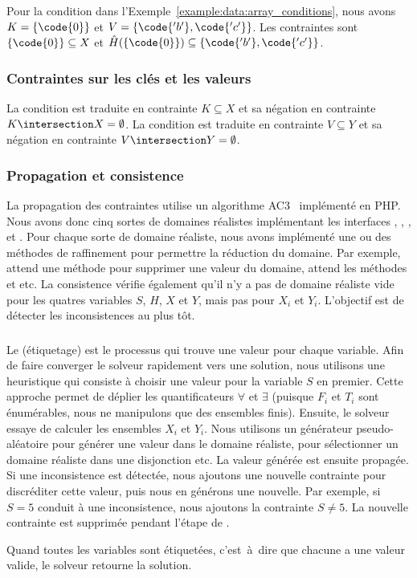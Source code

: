 Pour la condition  dans
l'Exemple~\ref{example:data:array_conditions}, nous avons $K = \{\code{0}\}$ et
$V = \{\code{'b'}, \code{'c'}\}$. Les contraintes sont $\{\code{0}\} \subseteq
X$ et $\hat{H}(\{\code{0}\}) \subseteq \{\code{'b'}, \code{'c'}\}$.

\subsubsection{Contraintes sur les clés et les valeurs}

La condition  est traduite en contrainte $K \subseteq X$ et sa
négation  en contrainte $K \intersection X = \emptyset$. La
condition  est traduite en contrainte $V \subseteq Y$ et sa
négation  en contrainte $V \intersection Y = \emptyset$.

\subsubsection{Propagation et consistence}

La propagation des contraintes utilise un algorithme AC3~
implémenté en PHP. Nous avons donc cinq sortes de domaines réalistes
implémentant les interfaces , , ,
 et . Pour chaque sorte de domaine réaliste, nous
avons implémenté une ou des méthodes de raffinement pour permettre la réduction
du domaine. Par exemple,  attend une méthode 
pour supprimer une valeur du domaine,  attend les méthodes
 et  etc. La consistence vérifie
également qu'il n'y a pas de domaine réaliste vide pour les quatres variables
$S$, $H$, $X$ et $Y$, mais pas pour $X_i$ et $Y_i$. L'objectif est de détecter
les inconsistences au plus tôt.

\subsubsection{}

Le  (étiquetage) est le processus qui trouve une valeur
pour chaque variable. Afin de faire converger le solveur rapidement vers une
solution, nous utilisons une heuristique qui consiste à choisir une valeur pour
la variable $S$ en premier. Cette approche permet de déplier les quantificateurs
$\forall$ et $\exists$ (puisque $F_i$ et $T_i$ sont énumérables, nous ne
manipulons que des ensembles finis). Ensuite, le solveur essaye de calculer les
ensembles $X_i$ et $Y_i$. Nous utilisons un générateur pseudo-aléatoire pour
générer une valeur dans le domaine réaliste, pour sélectionner un domaine
réaliste dans une disjonction etc. La valeur générée est ensuite propagée. Si
une inconsistence est détectée, nous ajoutons une nouvelle contrainte pour
discréditer cette valeur, puis nous en générons une nouvelle. Par exemple, si $S
= 5$ conduit à une inconsistence, nous ajoutons la contrainte $S \neq 5$. La
nouvelle contrainte est supprimée pendant l'étape de .

Quand toutes les variables sont étiquetées, c'est~à~dire que chacune a une valeur
valide, le solveur retourne la solution.

